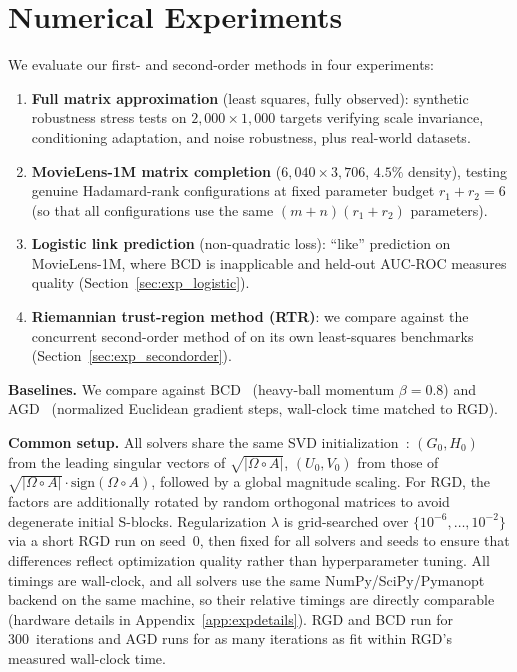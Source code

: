 \documentclass[letterpaper, 10 pt, conference]{ieeeconf}
\newcommand{\Had}{\circ}
\theoremstyle{plain}
\theoremstyle{definition}
\theoremstyle{remark}
\newcommand{\BMmod}[1]{{\color{blue}#1}}%
\begin{document}
\section{Numerical Experiments}
\label{sec:experiments}

We evaluate our first- and second-order methods in four experiments:
\begin{enumerate}[nosep,label=(\Alph*)]
\item \textbf{Full matrix approximation} (least squares, fully observed): synthetic robustness stress tests on $2{,}000{\times}1{,}000$ targets verifying scale invariance, conditioning adaptation, and noise robustness, plus real-world datasets.
\item \textbf{MovieLens-1M matrix completion} ($6{,}040{\times}3{,}706$, $4.5\%$ density), testing genuine Hadamard-rank configurations at fixed parameter budget $r_1{+}r_2{=}6$ (so that all configurations use the same $(m{+}n)(r_1{+}r_2)$ parameters).
\item \textbf{Logistic link prediction} (non-quadratic loss): ``like'' prediction on MovieLens-1M, where BCD is inapplicable and held-out AUC-ROC measures quality (Section~\ref{sec:exp_logistic}).
\item \textbf{Riemannian trust-region method (RTR)}: we compare against the concurrent second-order method of \citet{gillis2026manifold} on its own least-squares benchmarks (Section~\ref{sec:exp_secondorder}).
\end{enumerate}


\noindent\textbf{Baselines.}
We compare against BCD~\cite{wertz2024bcd} (heavy-ball momentum $\beta{=}0.8$) and AGD~\cite{ciaperoni2024hadamard} (normalized Euclidean gradient steps, wall-clock time matched to RGD).

\noindent\textbf{Common setup.}
All solvers share the same SVD initialization~\cite{wertz2024bcd}: $(G_0,H_0)$ from the leading singular vectors of $\sqrt{|\Omega\Had A|}$, $(U_0,V_0)$ from those of $\sqrt{|\Omega\Had A|}\cdot\mathrm{sign}(\Omega\Had A)$, followed by a global magnitude scaling. For RGD, the factors are additionally rotated by random orthogonal matrices to avoid degenerate initial S-blocks.
Regularization $\lambda$ is grid-searched over $\{10^{-6},\ldots,10^{-2}\}$ via a short RGD run on seed~0, then fixed for all solvers and seeds to ensure that differences reflect optimization quality rather than hyperparameter tuning.
All timings are wall-clock, and all solvers use the same NumPy/SciPy/Pymanopt~\cite{pymanopt} backend on the same machine, so their relative timings are directly comparable (hardware details in Appendix~\ref{app:expdetails}). RGD and BCD run for 300~iterations and AGD runs for as many iterations as fit within RGD's measured wall-clock time.
\end{document}
